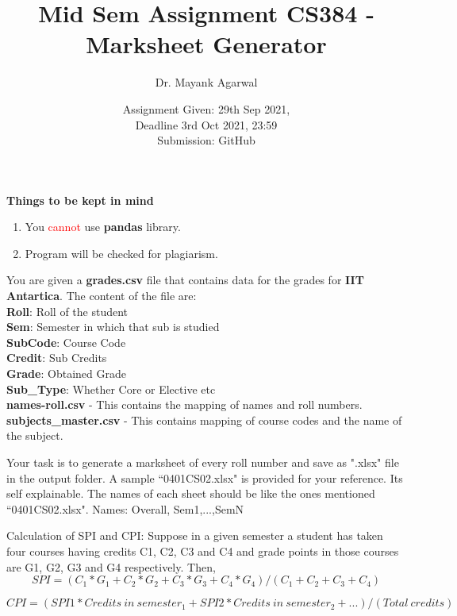 \documentclass[12pt,  letterpaper,  twoside]{article}
\title{Mid Sem Assignment CS384 -  Marksheet Generator}
\author{Dr. Mayank Agarwal}
\date{Assignment Given: 29th Sep 2021,\\ Deadline 3rd Oct 2021,  
23:59\\Submission: GitHub }
\begin{document}
	\maketitle  
	\textbf{Things to be kept in mind}\\
	\begin{enumerate}
				\item You \textcolor{red}{cannot }use \textbf{pandas} 
library.   
\item Program will be checked for plagiarism.   

	\end{enumerate}
	
	
You are given a \textbf{grades.csv} file that contains data for the grades for 
\textbf{IIT 
Antartica}. 	The content of the file are: \\
\textbf{Roll}: Roll of the student\\	
\textbf{Sem}: Semester in which that sub is studied	\\
\textbf{SubCode}: Course Code \\	
\textbf{Credit}: Sub Credits\\	
\textbf{Grade}: Obtained Grade\\	
\textbf{Sub\_Type}: Whether Core or Elective etc \\

\textbf{names-roll.csv} - This contains the mapping of names and roll numbers.\\

\textbf{subjects\_master.csv} - This contains mapping of course codes and the 
name of the subject. 

Your task is to generate a marksheet of every roll number and save as ".xlsx" 
file in the output folder. A sample ``0401CS02.xlsx" is provided for your 
reference. Its self explainable. The names of each sheet should be like the 
ones mentioned ``0401CS02.xlsx". Names: Overall, Sem1,...,SemN 



Calculation of SPI and CPI:
Suppose in a given semester a student has taken four courses having credits C1, 
C2, C3 and C4 and
grade points in those courses are G1, G2, G3 and G4 respectively. Then,
\begin{equation}
	SPI = (C_1 * G_1 + C_2 * G_2 + C_3 * G_3 + C_4 * G_4) / (C_1 + C_2 + C_3 + 
	C_4)
\end{equation}

\begin{equation}
	CPI = (SPI1 * Credits\ in\ semester_1 + SPI2 * Credits\ in\ semester_2 + 
	...) / (Total\ credits)
\end{equation}
\end{document}
